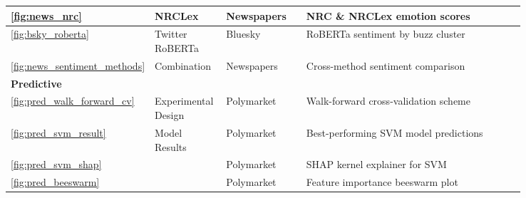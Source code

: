 \begin{longtable}{|p{0.05\linewidth}|p{0.14\linewidth}|p{0.16\linewidth}|p{0.43\linewidth}|p{0.06\linewidth}|}
\textcolor{textmuted}{\small\ref{fig:news_nrc}}                    & \textcolor{textmuted}{\small NRCLex}            & \textcolor{textmuted}{\small Newspapers}      & \textcolor{textmuted}{\small NRC \& NRCLex emotion scores}              & \textcolor{textmuted}{\small\pageref{fig:news_nrc}} \\\hline
\textcolor{textmuted}{\small\ref{fig:bsky_roberta}}                & \textcolor{textmuted}{\small Twitter RoBERTa}   & \textcolor{textmuted}{\small Bluesky}         & \textcolor{textmuted}{\small RoBERTa sentiment by buzz cluster}         & \textcolor{textmuted}{\small\pageref{fig:bsky_roberta}} \\\hline
\textcolor{textmuted}{\small\ref{fig:news_sentiment_methods}}      & \textcolor{textmuted}{\small Combination}       & \textcolor{textmuted}{\small Newspapers}      & \textcolor{textmuted}{\small Cross-method sentiment comparison}         & \textcolor{textmuted}{\small\pageref{fig:news_sentiment_methods}} \\\hline

\multicolumn{5}{|l|}{\rule[-0.3em]{0pt}{1.2em}\textcolor{textprimary}{\sffamily\bfseries\small\enspace 6 \enspace Predictive}} \\
\hline
\textcolor{textmuted}{\small\ref{fig:pred_walk_forward_cv}}        & \textcolor{textmuted}{\small Experimental Design} & \textcolor{textmuted}{\small Polymarket}      & \textcolor{textmuted}{\small Walk-forward cross-validation scheme}      & \textcolor{textmuted}{\small\pageref{fig:pred_walk_forward_cv}} \\\hline
\textcolor{textmuted}{\small\ref{fig:pred_svm_result}}            & \textcolor{textmuted}{\small Model Results}       & \textcolor{textmuted}{\small Polymarket}      & \textcolor{textmuted}{\small Best-performing SVM model predictions}     & \textcolor{textmuted}{\small\pageref{fig:pred_svm_result}} \\\hline
\textcolor{textmuted}{\small\ref{fig:pred_svm_shap}}              &                                                    & \textcolor{textmuted}{\small Polymarket}      & \textcolor{textmuted}{\small SHAP kernel explainer for SVM}            & \textcolor{textmuted}{\small\pageref{fig:pred_svm_shap}} \\\hline
\textcolor{textmuted}{\small\ref{fig:pred_beeswarm}}              &                                                    & \textcolor{textmuted}{\small Polymarket}      & \textcolor{textmuted}{\small Feature importance beeswarm plot}         & \textcolor{textmuted}{\small\pageref{fig:pred_beeswarm}} \\\hline

\end{longtable}
\flushbottom

